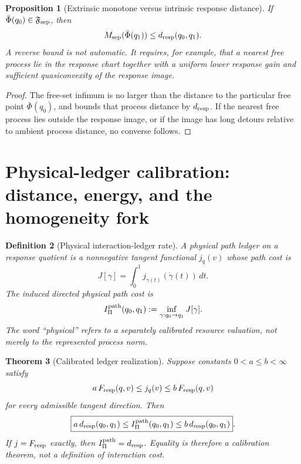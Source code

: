 \documentclass[11pt]{article}
\newtheorem{theorem}{Theorem}[section]
\newtheorem{proposition}[theorem]{Proposition}
\newtheorem{definition}[theorem]{Definition}
\theoremstyle{remark}
\newcommand{\Fresp}{F_{\rm resp}}
\newcommand{\dresp}{d_{\rm resp}}
\begin{document}
\begin{proposition}[Extrinsic monotone versus intrinsic response distance]
\label{prop:extrinsic-intrinsic}
If $\bar\Phi(q_0)\in\mathfrak F_{\rm sep}$, then
\[
        M_{\rm sep}(\bar\Phi(q_1))\le\dresp(q_0,q_1).
\]
A reverse bound is not automatic.  It requires, for example, that a nearest free process lie in the response chart together with a uniform lower response gain and sufficient quasiconvexity of the response image.
\end{proposition}

\begin{proof}
The free-set infimum is no larger than the distance to the particular free point $\bar\Phi(q_0)$, and  bounds that process distance by $\dresp$.  If the nearest free process lies outside the response image, or if the image has long detours relative to ambient process distance, no converse follows.
\end{proof}

\section{Physical-ledger calibration: distance, energy, and the homogeneity fork}
\label{sec:ledger-calibration}

\begin{definition}[Physical interaction-ledger rate]
A physical path ledger on a response quotient is a nonnegative tangent functional $j_q(v)$ whose path cost is
\[
        J[\gamma]=\int_0^1 j_{\gamma(t)}(\dot\gamma(t))\,dt.
\]
The induced directed physical path cost is
\[
        I_\Pi^{\rm path}(q_0,q_1)
        :=\inf_{\gamma:q_0\to q_1}J[\gamma].
\]
The word ``physical'' refers to a separately calibrated resource valuation, not merely to the represented process norm.
\end{definition}

\begin{theorem}[Calibrated ledger realization]
\label{thm:ledger-calibration}
Suppose constants $0<a\le b<\infty$ satisfy
\[
        a\,\Fresp(q,v)
        \le j_q(v)
        \le b\,\Fresp(q,v)
\]
for every admissible tangent direction.  Then
\[
        \boxed{
        a\,\dresp(q_0,q_1)
        \le I_\Pi^{\rm path}(q_0,q_1)
        \le b\,\dresp(q_0,q_1)
        }.
\]
If $j=\Fresp$ exactly, then $I_\Pi^{\rm path}=\dresp$.  Equality is therefore a calibration theorem, not a definition of interaction cost.
\end{theorem}
\end{document}
